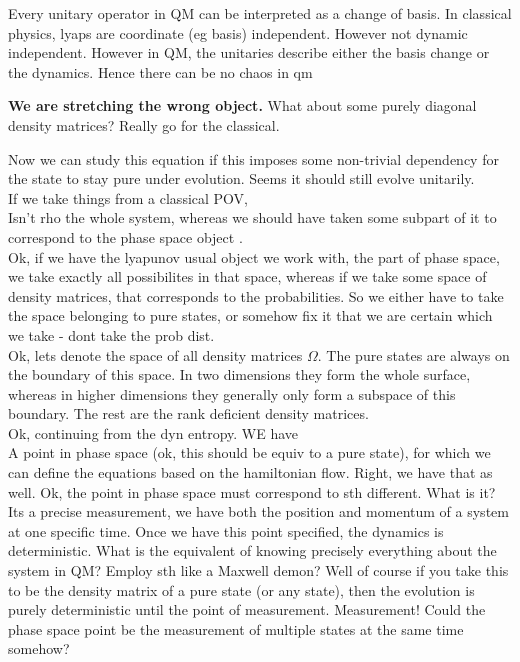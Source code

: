 \documentclass{article}
\begin{document}
 Every unitary operator in QM can be interpreted as a change of basis. In classical physics, lyaps are coordinate (eg basis) independent. However not dynamic independent. However in QM, the unitaries describe either the basis change or the dynamics. Hence there can be no chaos in qm

 \textbf{We are stretching the wrong object.}
 What about some purely diagonal density matrices? Really go for the classical. 

 
 Now we can study this equation if this imposes some non-trivial dependency for the state to stay pure under evolution. Seems it should still evolve unitarily. \\

 If we take things from a classical POV, \\
 Isn't rho the whole system, whereas we should have taken some subpart of it to correspond to the phase space object . \\

 Ok, if we have the lyapunov usual object we work with, the part of phase space, we take exactly all possibilites in that space, whereas if we take some space of density matrices, that corresponds to the probabilities. So we either have to take the space belonging to pure states, or somehow fix it that we are certain which we take - dont take the prob dist. \\
 Ok, lets denote the space of all density matrices $\Omega$. The pure states are always on the boundary of this space. In two dimensions they form the whole surface, whereas in higher dimensions they generally only form a subspace of this boundary. The rest are the rank deficient density matrices. \\

 Ok, continuing from the dyn entropy. WE have\\
 A point in phase space (ok, this should be equiv to a pure state), for which we can define the equations based on the hamiltonian flow. Right, we have that as well. Ok, the point in phase space must correspond to sth different. What is it? Its a precise measurement, we have both the position and momentum of a system at one specific time. Once we have this point specified, the dynamics is deterministic. What is the equivalent of knowing precisely everything about the system in QM? Employ sth like a Maxwell demon? Well of course if you take this to be the density matrix of a pure state (or any state), then the evolution is purely deterministic until the point of measurement. Measurement! Could the phase space point be the measurement of multiple states at the same time somehow? 
\end{document}
